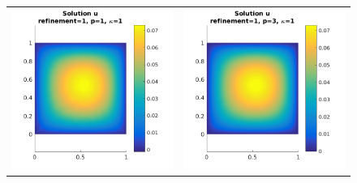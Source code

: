 \documentclass{article}
\begin{document}
\begin{figure}[!ht]
\begin{tabular}{c c}
\includegraphics[scale=0.7]{umu_121.png} & 
\includegraphics[scale=0.7]{umu_221.png} \\

\end{tabular}
\end{figure}
\end{document}
